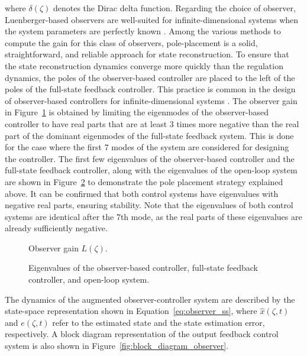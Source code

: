 where $\delta(\zeta)$ denotes the Dirac delta function. Regarding the choice of observer, Luenberger-based observers are well-suited for infinite-dimensional systems when the system parameters are perfectly known \autocite{Ali2015Review}. Among the various methods to compute the gain for this class of observers, pole-placement is a solid, straightforward, and reliable approach for state reconstruction. To ensure that the state reconstruction dynamics converge more quickly than the regulation dynamics, the poles of the observer-based controller are placed to the left of the poles of the full-state feedback controller. This practice is common in the design of observer-based controllers for infinite-dimensional systems \autocite{Morris2020Controller}. The observer gain in Figure~\ref{fig:L_modes} is obtained by limiting the eigenmodes of the observer-based controller to have real parts that are at least 3 times more negative than the real part of the dominant eigenmodes of the full-state feedback system. This is done for the case where the first 7 modes of the system are considered for designing the controller. The first few eigenvalues of the observer-based controller and the full-state feedback controller, along with the eigenvalues of the open-loop system are shown in Figure~\ref{fig:eigs} to demonstrate the pole placement strategy explained above. It can be confirmed that both control systems have eigenvalues with negative real parts, ensuring stability. Note that the eigenvalues of both control systems are identical after the 7th mode, as the real parts of these eigenvalues are already sufficiently negative.

\begin{figure}[!htbp]
    \centering
    
    \caption{Observer gain ${L}(\zeta)$.}
    \label{fig:L_modes}
\end{figure}

\begin{figure}[!htbp]
    \centering
    
    \caption{Eigenvalues of the observer-based controller, full-state feedback controller, and open-loop system.}
    \label{fig:eigs}
\end{figure}

The dynamics of the augmented observer-controller system are described by the state-space representation shown in Equation~\ref{eq:observer_ss}, where $\hat{{x}}(\zeta, t)$ and ${e}(\zeta, t)$ refer to the estimated state and the state estimation error, respectively. A block diagram representation of the output feedback control system is also shown in Figure~\ref{fig:block_diagram_observer}.

